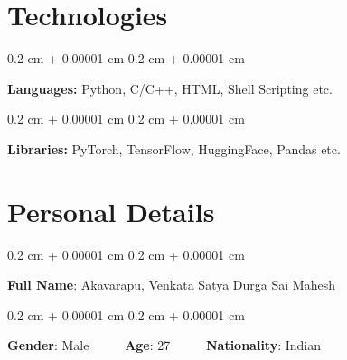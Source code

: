 \documentclass[12pt, letterpaper]{article}
\newenvironment{onecolentry}{
    \begin{adjustwidth}{
        0.2 cm + 0.00001 cm
    }{
        0.2 cm + 0.00001 cm
    }
}{
    \end{adjustwidth}
} %
\begin{document}
    \section{Technologies}



        
        \begin{onecolentry}
            \textbf{Languages:} Python, C/C++, HTML, Shell Scripting etc.
        \end{onecolentry}

        \vspace{0.2 cm}

        \begin{onecolentry}
            \textbf{Libraries:} PyTorch, TensorFlow, HuggingFace, Pandas etc.
        \end{onecolentry}


    
    \section{Personal Details}



        
        \begin{onecolentry}
            \textbf{Full Name}: Akavarapu, Venkata Satya Durga Sai Mahesh
        \end{onecolentry}

        \vspace{0.2 cm}

        \begin{onecolentry}
            \textbf{Gender}: Male \ \ \ \ \ \textbf{Age}: 27 \ \ \ \ \ \textbf{Nationality}: Indian
        \end{onecolentry}


    
\end{document}
